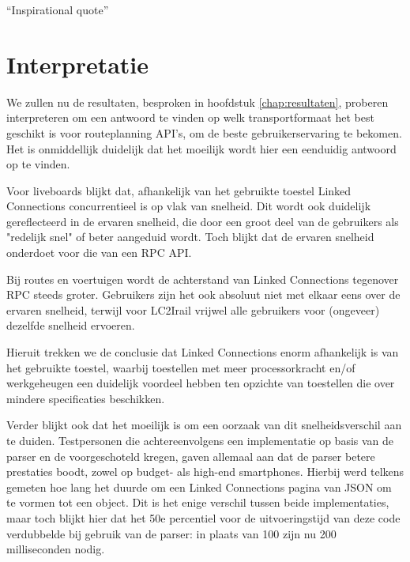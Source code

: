 \begin{savequote}[0.55\linewidth]
	``Inspirational quote''
\end{savequote}

\chapter{Interpretatie}
\label{chap:interpretatie}

We zullen nu de resultaten, besproken in hoofdstuk \ref{chap:resultaten}, proberen interpreteren om een antwoord te vinden op welk transportformaat het best geschikt is voor routeplanning API's, om de beste gebruikerservaring te bekomen. Het is onmiddellijk duidelijk dat het moeilijk wordt hier een eenduidig antwoord op te vinden.

Voor liveboards blijkt dat, afhankelijk van het gebruikte toestel Linked Connections concurrentieel is op vlak van snelheid. Dit wordt ook duidelijk gereflecteerd in de ervaren snelheid, die door een groot deel van de gebruikers als "redelijk snel" of beter aangeduid wordt. Toch blijkt dat de ervaren snelheid onderdoet voor die van een RPC API.

Bij routes en voertuigen wordt de achterstand van Linked Connections tegenover RPC steeds groter. Gebruikers zijn het ook absoluut niet met elkaar eens over de ervaren snelheid, terwijl voor LC2Irail vrijwel alle gebruikers voor (ongeveer) dezelfde snelheid ervoeren. 

Hieruit trekken we de conclusie dat Linked Connections enorm afhankelijk is van het gebruikte toestel,  waarbij toestellen met meer processorkracht en/of werkgeheugen een duidelijk voordeel hebben ten opzichte van toestellen die over mindere specificaties beschikken.

Verder blijkt ook dat het moeilijk is om een oorzaak van dit snelheidsverschil aan te duiden. Testpersonen die achtereenvolgens een implementatie op basis van de  parser en de  voorgeschoteld kregen, gaven allemaal aan dat de  parser betere prestaties boodt, zowel op budget- als high-end smartphones. Hierbij werd telkens gemeten hoe lang het duurde om een Linked Connections pagina van JSON om te vormen tot een object. Dit is het enige verschil tussen beide implementaties, maar toch blijkt hier dat het 50e percentiel voor de uitvoeringstijd van deze code verdubbelde bij gebruik van de  parser: in plaats van 100 zijn nu 200 milliseconden nodig.

